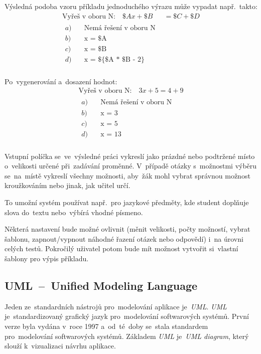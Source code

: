 \documentclass[10pt,a4paper]{article}
\begin{document}
        Výsledná podoba vzoru příkladu jednoduchého výrazu může vypadat např.~takto:
        \begin{align*}
            \text{Vyřeš v oboru N:} \quad \$Ax + \$B &= \$C + \$D \\
            \begin{aligned}
                a) \quad &\text{Nemá řešení v oboru N} \\
                b) \quad &\text{x = \$A} \\
                c) \quad &\text{x = \$B} \\
                d) \quad &\text{x = \$\{\$A * \$B - 2\}} \\
            \end{aligned}
        \end{align*}

        Po~vygenerování a~dosazení hodnot:
        \begin{align*}
            \text{Vyřeš v oboru N:} \quad 3x + 5 = 4 + 9 \\
            \begin{aligned}
                a) \quad &\text{Nemá řešení v oboru N} \\
                b) \quad &\text{x = 3} \\
                c) \quad &\text{x = 5} \\
                d) \quad &\text{x = 13} \\
            \end{aligned}
        \end{align*}

        Vstupní políčka se~ve~výsledné práci vykreslí jako prázdné nebo podtržené místo o~velikosti určené při~zadávání proměnné. V~případě otázky s~možnostmi výběru se~na~místě vykreslí všechny možnosti, aby~žák mohl vybrat správnou možnost kroužkováním nebo jinak, jak učitel určí.
        
        To umožní systém používat např.~pro jazykové předměty, kde student doplňuje slova do~textu nebo~výbírá vhodné písmeno.

        Některá nastavení bude možné ovlivnit (měnit velikosti, počty možností, vybrat šablonu, zapnout/vypnout náhodné řazení otázek nebo odpovědí) i~na úrovni celých testů. Pokročilý uživatel potom bude mít možnost vytvořit si~vlastní šablony pro výpis příkladu.

        \subsection{UML~--~Unified Modeling Language}
        Jeden ze~standardních nástrojů pro~modelování aplikace je~\emph{UML}. \emph{UML} je~standardizovaný grafický jazyk pro~modelování softwarových systémů. První verze byla vydána v~roce 1997 a~od~té~doby se~stala standardem pro~modelování softwarových systémů. Základem \emph{UML} je~\emph{UML diagram}, který slouží k~vizualizaci návrhu aplikace. \cite{uml:diagram}
        
\end{document}
